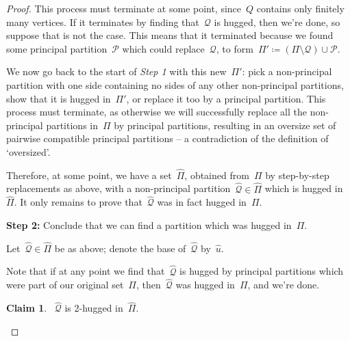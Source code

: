 \documentclass[11pt]{amsart}
\theoremstyle{definition}
\theoremstyle{definition}
\theoremstyle{definition}
\theoremstyle{definition}
\newtheorem*{claim*}{Claim}
\newcommand{\calQ}{\mathcal{Q}}
\newcommand{\calP}{\mathcal{P}} %
\begin{document}
\begin{proof}
    This process must terminate at some point, since~$Q$ contains only finitely many vertices. If it terminates by finding that~$\calQ$ is hugged, then we're done, so suppose that is not the case. This means that it terminated because we found some principal partition~$\calP$ which could replace~$\calQ$, to form~$\Pi' \coloneqq \left( \Pi \setminus \calQ\right) \cup \calP$.

    We now go back to the start of \emph{Step 1} with this new~$\Pi'$: pick a non-principal partition with one side containing no sides of any other non-principal partitions, show that it is hugged in~$\Pi'$, or replace it too by a principal partition. This process must terminate, as otherwise we will successfully replace all the non-principal partitions in~$\Pi$ by principal partitions, resulting in an oversize set of pairwise compatible principal partitions -- a contradiction of the definition of `oversized'.

    Therefore, at some point, we have a set~$\widehat{\Pi}$, obtained from~$\Pi$ by step-by-step replacements as above, with a non-principal partition~$\widehat{\calQ} \in \widehat{\Pi}$ which is hugged in~$\widehat{\Pi}$. It only remains to prove that~$\widehat{\calQ}$ was in fact hugged in~$\Pi$. 

    \textbf{Step 2:} Conclude that we can find a partition which was hugged in~$\Pi$.

    Let~$\widehat{\calQ} \in \widehat{\Pi}$ be as above; denote the base of~$\widehat{\calQ}$ by~$\widehat{u}$.

    Note that if at any point we find that~$\widehat{\calQ}$ is hugged by principal partitions which were part of our original set~$\Pi$, then~$\widehat{\calQ}$ was hugged in~$\Pi$, and we're done. 
    
    \begin{claim*}
        ~$\widehat{\calQ}$ is 2-hugged in~$\widehat{\Pi}$. 
    \end{claim*}


\end{proof}
\end{document}

